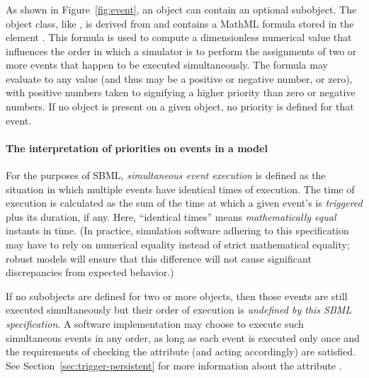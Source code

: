 \subsubsection{}
\label{sec:event-priority}

As shown in Figure~\ref{fig:event}, an \Event object can contain
an optional \Priority subobject.  The \Priority object class, like
\Delay, is derived from \SBase and contains a MathML formula
stored in the element .  This formula is used to
compute a dimensionless numerical value that influences the order
in which a simulator is to perform the assignments of two or more
events that happen to be executed simultaneously.  The formula may
evaluate to any  value (and thus may be a positive
or negative number, or zero), with positive numbers taken to
signifying a higher priority than zero or negative numbers.  If no
\Priority object is present on a given \Event object, no priority
is defined for that event.


\paragraph{The interpretation of priorities on events in a model}

For the purposes of SBML, \emph{simultaneous event execution} is
defined as the situation in which multiple events have identical
times of execution.  The time of execution is calculated as the
sum of the time at which a given event's \Trigger is \emph{triggered}
plus its \Delay duration, if any.  Here, ``identical times'' means
\emph{mathematically equal} instants in time.  (In practice,
simulation software adhering to this specification may have to
rely on numerical equality instead of strict mathematical
equality; robust models will ensure that this difference will not
cause significant discrepancies from expected behavior.)

If no \Priority subobjects are defined for two or more \Event
objects, then those events are still executed simultaneously but
their order of execution is \emph{undefined by this SBML
  specification}.  A software implementation may choose to execute
such simultaneous events in any order, as long as each event is
executed only once and the requirements of checking the
 attribute (and acting accordingly) are
satisfied.  See Section~\ref{sec:trigger-persistent} for more
information about the attribute .

